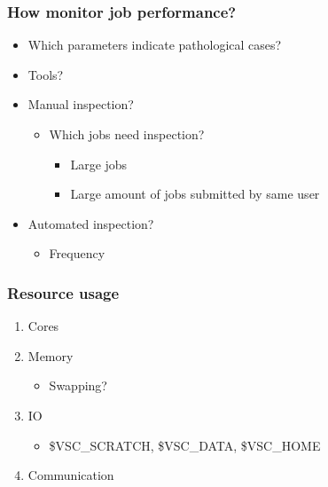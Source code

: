 \documentclass[aspectratio=1610]{beamer}
\begin{document}
\begin{frame}
  \frametitle{How monitor job performance?}
  
  \begin{itemize}
    \item Which parameters indicate pathological cases?
    \pause
    \item Tools?
    \pause
    \item Manual inspection?
    \pause
      \begin{itemize}
        \item Which jobs need inspection?
        \begin{itemize}
          \item Large jobs
          \item Large amount of jobs submitted by same user
        \end{itemize}
      \end{itemize}
    \pause
    \item Automated inspection?
      \begin{itemize}
        \item Frequency  
      \end{itemize}
  \end{itemize}
\end{frame}

\begin{frame}
  \frametitle{Resource usage}
  \begin{enumerate} 
    \item Cores
    \pause
    \item Memory
    \begin{itemize}
      \item Swapping?
    \end{itemize}
    \pause
    \item IO
    \begin{itemize}
      \item \$VSC\_SCRATCH, \$VSC\_DATA, \$VSC\_HOME
    \end{itemize}
    \pause
    \item Communication
  \end{enumerate}
\end{frame}
\end{document}
